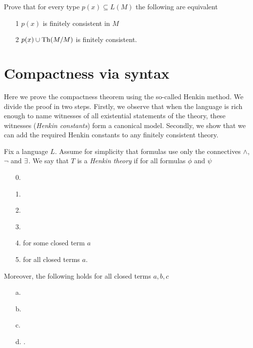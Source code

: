 \begin{exercise}\label{ex_fin_cons_in_M}
  Prove that for every type $p(x)\subseteq L(M)$ the following are equivalent
  \begin{itemize}
    \item[1] $p(x)$ is finitely consistent in $M$
    \item[2] $p(x)\cup{\rm Th}(M/M)$ is finitely consistent.
  \end{itemize}
\end{exercise}

\section{Compactness via syntax}

Here we prove the compactness theorem using the so-called Henkin method. We divide the proof in two steps. Firstly, we observe that when the language is rich enough to name witnesses of all existential statements of the theory, these witnesses (\textit{Henkin constants\/}) form a canonical model. Secondly, we show that we can add the required Henkin constants to any finitely consistent theory.

\begin{definition}\label{def_Henkin}
Fix a language $L$.
Assume for simplicity that formulas use only the connectives $\wedge$, $\neg$ and $\exists$.
We say that $T$ is a \emph{Henkin theory\/} if for all formulas $\phi$ and $\psi$

\begin{itemize}
\item[0.]
\item[1.]
\item[2.]
\item[3.]
\item[4.]\quad for some closed term $a$
\item[5.]\quad for all closed terms $a$.
\end{itemize}
Moreover, the following holds for all closed terms $a, b, c$
\begin{itemize}
\item[a.] 
\item[b.] 
\item[c.] 
\item[d.] .
\end{itemize}
\end{definition}

